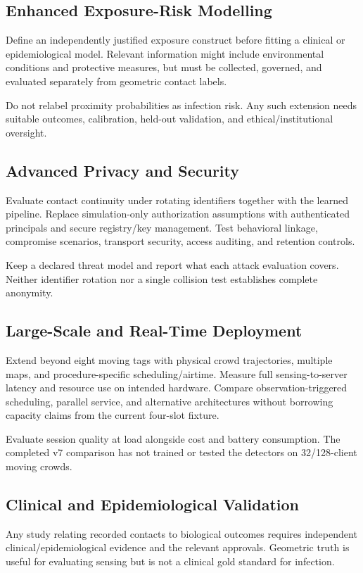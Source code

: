 \documentclass[12pt,a4paper]{report}
\begin{document}
\subsection*{Enhanced Exposure-Risk Modelling}
Define an independently justified exposure construct before fitting a clinical or epidemiological model. Relevant information might include environmental conditions and protective measures, but must be collected, governed, and evaluated separately from geometric contact labels.

Do not relabel proximity probabilities as infection risk. Any such extension needs suitable outcomes, calibration, held-out validation, and ethical/institutional oversight.

\subsection*{Advanced Privacy and Security}
Evaluate contact continuity under rotating identifiers together with the learned pipeline. Replace simulation-only authorization assumptions with authenticated principals and secure registry/key management. Test behavioral linkage, compromise scenarios, transport security, access auditing, and retention controls.

Keep a declared threat model and report what each attack evaluation covers. Neither identifier rotation nor a single collision test establishes complete anonymity.

\subsection*{Large-Scale and Real-Time Deployment}
Extend beyond eight moving tags with physical crowd trajectories, multiple maps, and procedure-specific scheduling/airtime. Measure full sensing-to-server latency and resource use on intended hardware. Compare observation-triggered scheduling, parallel service, and alternative architectures without borrowing capacity claims from the current four-slot fixture.

Evaluate session quality at load alongside cost and battery consumption. The completed v7 comparison has not trained or tested the detectors on 32/128-client moving crowds.

\subsection*{Clinical and Epidemiological Validation}
Any study relating recorded contacts to biological outcomes requires independent clinical/epidemiological evidence and the relevant approvals. Geometric truth is useful for evaluating sensing but is not a clinical gold standard for infection.
\end{document}
